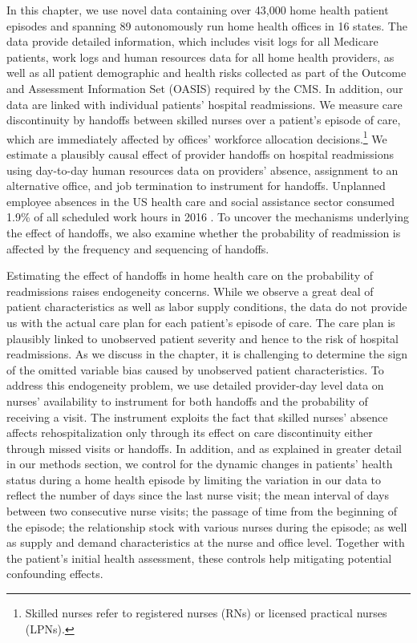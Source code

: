 \documentclass[final,12pt, notitlepage]{article}
\begin{document}
In this chapter, we use novel data containing over 43,000 home health patient episodes and spanning 89 autonomously run home health offices in 16 states. The data provide detailed information, which includes visit logs for all Medicare patients, work logs and human resources data for all home health providers, as well as all patient demographic and health risks collected as part of the Outcome and Assessment Information Set (OASIS) required by the CMS.
In addition, our data are linked with individual patients' hospital readmissions.
We measure care discontinuity by handoffs between skilled nurses over a patient's episode of care, which are immediately affected by offices' workforce allocation decisions.\footnote{Skilled nurses refer to registered nurses (RNs) or licensed practical nurses (LPNs).
}
We estimate a plausibly causal effect of provider handoffs on hospital readmissions using day-to-day human resources data on providers' absence, assignment to an alternative office, and job termination to instrument for handoffs.
Unplanned employee absences in the US health care and social assistance sector consumed 1.9\% of all scheduled work hours in 2016 \citep{BLS2017}.
To uncover the mechanisms underlying the effect of handoffs, we also examine whether the probability of readmission is affected by the frequency and sequencing of handoffs.


Estimating the effect of handoffs in home health care on the probability of readmissions raises endogeneity concerns.
While we observe a great deal of patient characteristics as well as labor supply conditions, the data do not provide us with the actual care plan for each patient's episode of care. The care plan is plausibly linked to unobserved patient severity and hence to the risk of hospital readmissions. As we discuss in the chapter, it is challenging to determine the sign of the omitted variable bias caused by unobserved patient characteristics.
To address this endogeneity problem, we use detailed provider-day level data on nurses' availability to instrument for both handoffs and the probability of receiving a visit. The instrument exploits the fact that skilled nurses' absence affects rehospitalization only through its effect on care discontinuity either through missed visits or handoffs. In addition, and as explained in greater detail in our methods section, we control for the dynamic changes in patients' health status during a home health episode by limiting the variation in our data to reflect the number of days since the last nurse visit; the mean interval of days between two consecutive nurse visits; the passage of time from the beginning of the episode; the relationship stock with various nurses during the episode; as well as supply and demand characteristics at the nurse and office level. Together with the patient's initial health assessment, these controls help mitigating potential confounding effects.
\end{document}
